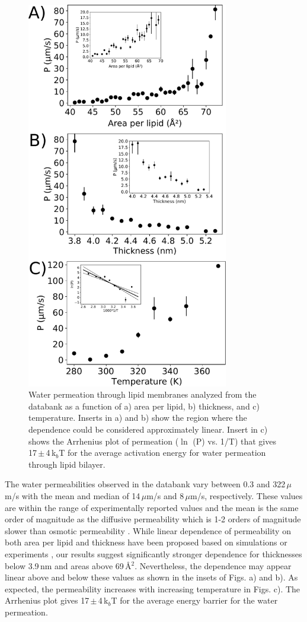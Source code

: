 \documentclass[fleqn,10pt]{wlscirep}
\begin{document}
\begin{figure}[tbp]
    \centering
    \includegraphics[width=88mm]{Figures/permeation.pdf}
    \caption{Water permeation through lipid membranes analyzed from the databank as a function of 
      a) area per lipid,
      b) thickness,
      and c) temperature. 
      Inserts in a) and b) show the region where the dependence could be considered approximately linear.
      Insert in c) shows the Arrhenius plot of permeation ($\ln$ (P) vs. 1/T) that gives 17\,$\pm$\,4\,k$_b$T for the average activation energy for water permeation through lipid bilayer.}
    \label{fig:permeability}
\end{figure}

The water permeabilities observed in the databank vary between 0.3 and 322\,$\mu$m/s with the mean and median of 14\,$\mu$m/s and 8\,$\mu$m/s, respectively.
These values are within the range of experimentally reported values and the mean is the same order of magnitude as the diffusive permeability which is 1-2 orders of 
magnitude slower than osmotic permeability \cite{jansen95,??}. While linear dependence of permeability on both area per lipid and thickness have been proposed based on
simulations or experiments \cite{mathai08,frallicciardi22}, our results suggest significantly stronger dependence for thicknesses below 3.9\,nm and areas above 69\,Å$^2$.
Nevertheless, the dependence may appear linear above and below these values as shown in the insets of Figs. \label{fig:permeability} a) and b).
As expected, the permeability increases with increasing temperature in Figs. \label{fig:permeability} c).
The Arrhenius plot gives 17\,$\pm$\,4\,k$_b$T for the average energy barrier for the water permeation. 
\end{document}
